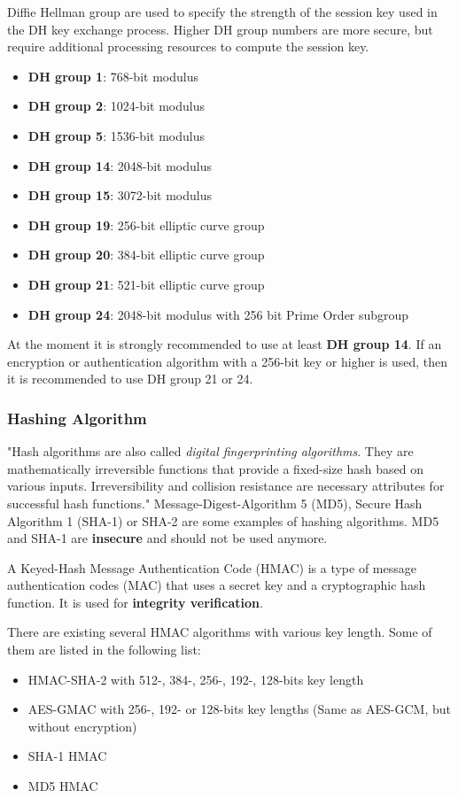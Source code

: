 \documentclass[a4paper]{report}
\begin{document}
Diffie Hellman group are used to specify the strength of the session key used in the DH key exchange process. Higher DH group numbers are more secure, but require additional processing resources to compute the session key. \parencite{JajishThomas}
\begin{itemize}
	\item \textbf{DH group 1}: 768-bit modulus
	\item \textbf{DH group 2}: 1024-bit modulus
	\item \textbf{DH group 5}: 1536-bit modulus
	\item \textbf{DH group 14}: 2048-bit modulus
	\item \textbf{DH group 15}: 3072-bit modulus
	\item \textbf{DH group 19}: 256-bit elliptic curve group
	\item \textbf{DH group 20}: 384-bit elliptic curve group
	\item \textbf{DH group 21}: 521-bit elliptic curve group
	\item \textbf{DH group 24}: 2048-bit modulus with 256 bit Prime Order subgroup
\end{itemize}

At the moment it is strongly recommended to use at least \textbf{DH group 14}. If an encryption or authentication algorithm with a 256-bit key or higher is used, then it is recommended to use DH group 21 or 24. \parencite{StrongSwan}

\subsubsection{Hashing Algorithm}
\label{sssec:hashing_algo}
"Hash algorithms are also called \textit{digital fingerprinting algorithms}. They are mathematically irreversible functions that provide a fixed-size hash based on various inputs. Irreversibility and collision resistance are necessary attributes for successful hash functions." \parencite{Kampanakis2015}
Message-Digest-Algorithm 5 (MD5), Secure Hash Algorithm 1 (SHA-1) or SHA-2 are some examples of hashing algorithms. MD5 and SHA-1 are \textbf{insecure} and should not be used anymore. 

A Keyed-Hash Message Authentication Code (HMAC) is a type of message authentication codes (MAC) that uses a secret key and a cryptographic hash function. It is used for 
\textbf{integrity verification}.

There are existing several HMAC algorithms with various key length. Some of them are listed in the following list:
\begin{itemize}
	\item HMAC-SHA-2 with 512-, 384-, 256-, 192-, 128-bits key length
	\item AES-GMAC with 256-, 192- or 128-bits key lengths (Same as AES-GCM, but without encryption)
	\item SHA-1 HMAC
	\item MD5 HMAC
\end{itemize}
\end{document}
